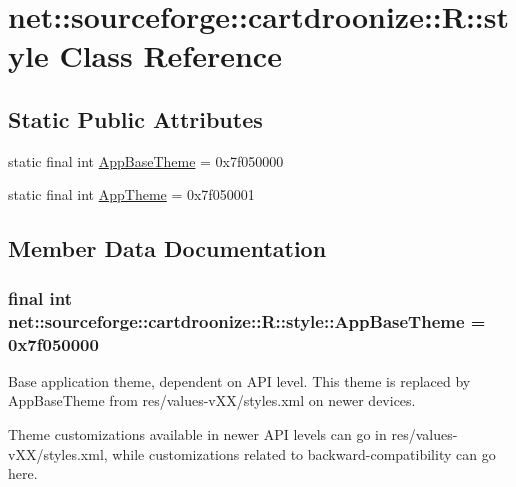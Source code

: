 \hypertarget{classnet_1_1sourceforge_1_1cartdroonize_1_1R_1_1style}{
\section{net::sourceforge::cartdroonize::R::style Class Reference}
\label{classnet_1_1sourceforge_1_1cartdroonize_1_1R_1_1style}
}
\subsection*{Static Public Attributes}
\begin{DoxyCompactItemize}
\item 
static final int \hyperlink{classnet_1_1sourceforge_1_1cartdroonize_1_1R_1_1style_a806d4c508b4b2cad62ce9aa0098a9e9e}{AppBaseTheme} = 0x7f050000
\item 
static final int \hyperlink{classnet_1_1sourceforge_1_1cartdroonize_1_1R_1_1style_a4e167c21d623225c442c6a2bcd06a82c}{AppTheme} = 0x7f050001
\end{DoxyCompactItemize}


\subsection{Member Data Documentation}
\hypertarget{classnet_1_1sourceforge_1_1cartdroonize_1_1R_1_1style_a806d4c508b4b2cad62ce9aa0098a9e9e}{
\subsubsection[{AppBaseTheme}]{\setlength{\rightskip}{0pt plus 5cm}final int {\bf net::sourceforge::cartdroonize::R::style::AppBaseTheme} = 0x7f050000}}
\label{classnet_1_1sourceforge_1_1cartdroonize_1_1R_1_1style_a806d4c508b4b2cad62ce9aa0098a9e9e}
Base application theme, dependent on API level. This theme is replaced by AppBaseTheme from res/values-\/vXX/styles.xml on newer devices.

Theme customizations available in newer API levels can go in res/values-\/vXX/styles.xml, while customizations related to backward-\/compatibility can go here.

